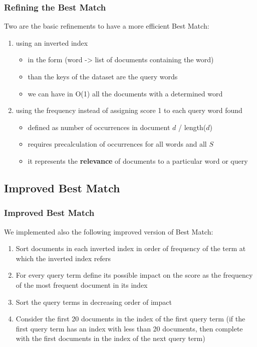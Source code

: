 \documentclass{beamer}
\begin{document}
\begin{frame}
\frametitle{Refining the Best Match}
Two are the basic refinements to have a more efficient Best Match:
\begin{enumerate}
	\item using an inverted index
	\begin{itemize}
		\item in the form (word -> list of documents containing the word)
		\item than the keys of the dataset are the query words
		\item we can have in O(1) all the documents with a determined word  
	\end{itemize}
	\item using the frequency instead of assigning score 1 to each query word found
	\begin{itemize}
		\item defined as number of occurrences in document $d$ / length($d$)
		\item requires precalculation of occurrences for all words and all $S$
		\item it represents the \textbf{relevance} of documents to a particular word or query
	\end{itemize}	
\end{enumerate}
\end{frame}

\subsection{Improved Best Match}
\newcommand{\asuivre}{\setcounter{sauvegardeenumi}{\theenumi}}
\newcommand{\suite}{\setcounter{enumi}{\thesauvegardeenumi}}

\begin{frame}
\frametitle{Improved Best Match}
We implemented also the following improved version of Best Match:
\begin{enumerate}
	\item Sort documents in each inverted index in order of frequency of the term at which the inverted index refers
	\item For every query term define its possible impact on the score as the frequency of the most frequent document in its index
	\item Sort the query terms in decreasing order of impact
	\item Consider the first 20 documents in the index of the first query term (if the first query term has an index with less than 20 documents, then complete with the first documents in the index of the next query term)
	\asuivre
\end{enumerate}
\end{frame}
\end{document}

